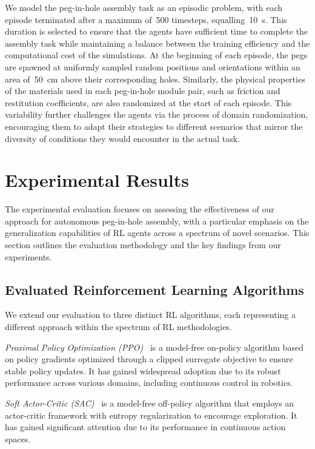 We model the peg-in-hole assembly task as an episodic problem, with each episode terminated after a maximum of~500 timesteps, equalling~10~s. This duration is selected to ensure that the agents have sufficient time to complete the assembly task while maintaining a balance between the training efficiency and the computational cost of the simulations. At the beginning of each episode, the pegs are spawned at uniformly sampled random positions and orientations within an area of~50~cm above their corresponding holes. Similarly, the physical properties of the materials used in each peg-in-hole module pair, such as friction and restitution coefficients, are also randomized at the start of each episode. This variability further challenges the agents via the process of domain randomization, encouraging them to adapt their strategies to different scenarios that mirror the diversity of conditions they would encounter in the actual task.


\section{Experimental Results}\label{sec:experimental-results}

The experimental evaluation focuses on assessing the effectiveness of our approach for autonomous peg-in-hole assembly, with a particular emphasis on the generalization capabilities of RL agents across a spectrum of novel scenarios. This section outlines the evaluation methodology and the key findings from our experiments.


\subsection{Evaluated Reinforcement Learning Algorithms}\label{ssec:evaluated-reinforcement-learning-algorithms}

We extend our evaluation to three distinct RL algorithms, each representing a different approach within the spectrum of RL methodologies.


\textit{Proximal Policy Optimization (PPO)}~\cite{schulman2017proximal} is a model-free on-policy algorithm based on policy gradients optimized through a clipped surrogate objective to ensure stable policy updates. It has gained widespread adoption due to its robust performance across various domains, including continuous control in robotics.

\textit{Soft Actor-Critic (SAC)}~\cite{haarnoja2018soft} is a model-free off-policy algorithm that employs an actor-critic framework with entropy regularization to encourage exploration. It has gained significant attention due to its performance in continuous action spaces.

